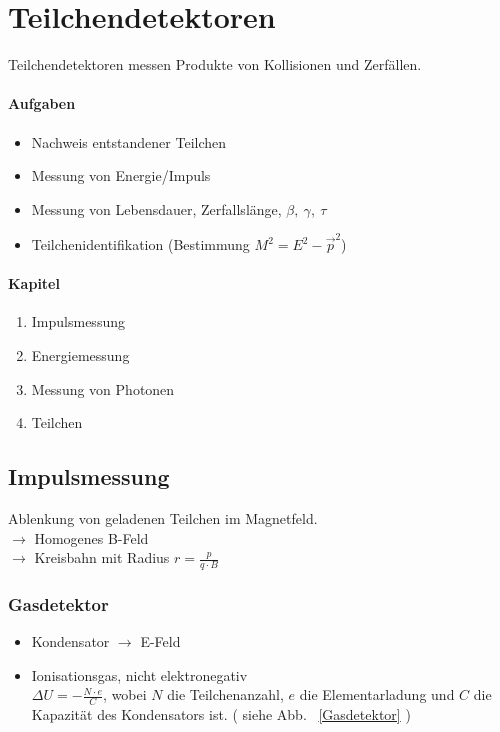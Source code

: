 \documentclass[Ex4_Zusammenfassung.tex]{subfiles}
\begin{document}
	
\chapter{Teilchendetektoren}
Teilchendetektoren messen Produkte von Kollisionen und Zerfällen.

\subsubsection*{Aufgaben}
\begin{itemize}
	\item Nachweis entstandener Teilchen
	\item Messung von Energie/Impuls
	\item Messung von Lebensdauer, Zerfallslänge, $\beta,\ \gamma,\ \tau$
	\item Teilchenidentifikation (Bestimmung $M^2 = E^2 - \vec{p}^2$)
\end{itemize}

\subsubsection*{Kapitel}
\begin{enumerate}[\hspace{0.5cm}{4.}1]
\item Impulsmessung
\item Energiemessung
\item Messung von Photonen
\item Teilchen
\end{enumerate}

\section{Impulsmessung}
Ablenkung von geladenen Teilchen im Magnetfeld.\\
$\rightarrow$ Homogenes B-Feld\\
$\rightarrow$ Kreisbahn mit Radius $r=\frac{p}{q\cdot B}$

\subsection*{Gasdetektor}
\begin{itemize}
	\item Kondensator $\rightarrow$ E-Feld
	\item Ionisationsgas, nicht elektronegativ\\ $\Delta U = -\frac{N\cdot e }{C}$, wobei $N$ die Teilchenanzahl, $e$ die Elementarladung und $C$ die Kapazität des Kondensators ist. ( siehe Abb. ~\ref{Gasdetektor} )
\end{itemize}
\end{document}
